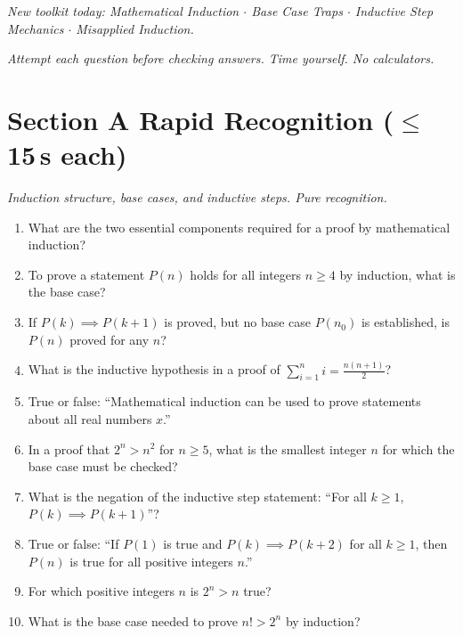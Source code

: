 \documentclass[11pt,a4paper]{article}
\begin{document}
\noindent\textit{New toolkit today: Mathematical Induction $\cdot$ Base Case Traps $\cdot$ Inductive Step Mechanics $\cdot$ Misapplied Induction.}

\vspace{2pt}
\noindent\textit{Attempt each question before checking answers. Time yourself. No calculators.}

\section*{Section A \quad Rapid Recognition \hfill{\normalfont\small($\leq$15\,s each)}}

\noindent\textit{Induction structure, base cases, and inductive steps. Pure recognition.}

\begin{enumerate}

\item What are the two essential components required for a proof by mathematical induction?

\item To prove a statement $P(n)$ holds for all integers $n \ge 4$ by induction, what is the base case?

\item If $P(k) \implies P(k+1)$ is proved, but no base case $P(n_0)$ is established, is $P(n)$ proved for any $n$?

\item What is the inductive hypothesis in a proof of $\sum_{i=1}^n i = \frac{n(n+1)}{2}$?

\item True or false: ``Mathematical induction can be used to prove statements about all real numbers $x$.''

\item In a proof that $2^n > n^2$ for $n \ge 5$, what is the smallest integer $n$ for which the base case must be checked?

\item What is the negation of the inductive step statement: ``For all $k \ge 1$, $P(k) \implies P(k+1)$''?

\item True or false: ``If $P(1)$ is true and $P(k) \implies P(k+2)$ for all $k \ge 1$, then $P(n)$ is true for all positive integers $n$.''

\item For which positive integers $n$ is $2^n > n$ true?

\item What is the base case needed to prove $n! > 2^n$ by induction?

\end{enumerate}
\end{document}
